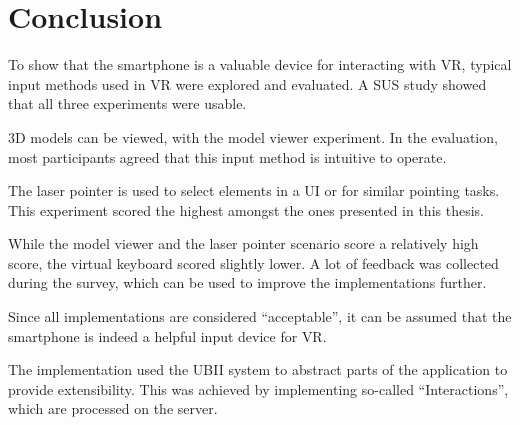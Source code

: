 \chapter{Conclusion}\label{chapter:conclusion}

To show that the smartphone is a valuable device for interacting with \gls{VR}, typical input methods used in \gls{VR} were explored and evaluated. A \gls{SUS} study showed that all three experiments were usable. 

\gls{3D} models can be viewed, with the model viewer experiment. In the evaluation, most participants agreed that this input method is intuitive to operate.

The laser pointer is used to select elements in a \gls{UI} or for similar pointing tasks. This experiment scored the highest amongst the ones presented in this thesis. 

While the model viewer and the laser pointer scenario score a relatively high score, the virtual keyboard scored slightly lower. A lot of feedback was collected during the survey, which can be used to improve the implementations further.

Since all implementations are considered \enquote{acceptable}, it can be assumed that the smartphone is indeed a helpful input device for \gls{VR}.

The implementation used the \gls{UBII} system to abstract parts of the application to provide extensibility. This was achieved by implementing so-called \enquote{Interactions}, which are processed on the server. 
